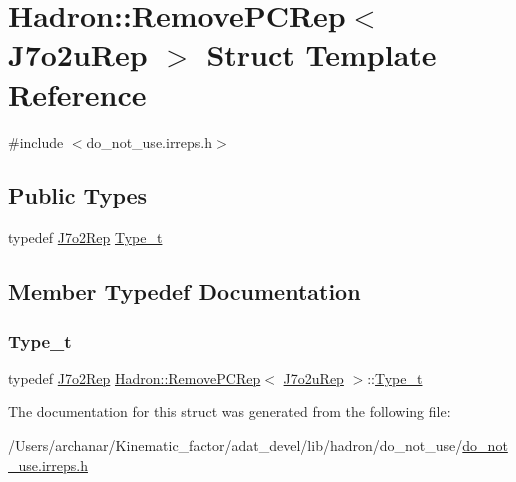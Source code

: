 \hypertarget{structHadron_1_1RemovePCRep_3_01J7o2uRep_01_4}{}\section{Hadron\+:\+:Remove\+P\+C\+Rep$<$ J7o2u\+Rep $>$ Struct Template Reference}
\label{structHadron_1_1RemovePCRep_3_01J7o2uRep_01_4}


{\ttfamily \#include $<$do\+\_\+not\+\_\+use.\+irreps.\+h$>$}

\subsection*{Public Types}
\begin{DoxyCompactItemize}
\item 
typedef \mbox{\hyperlink{structHadron_1_1J7o2Rep}{J7o2\+Rep}} \mbox{\hyperlink{structHadron_1_1RemovePCRep_3_01J7o2uRep_01_4_a41f9fc887bdc034a1a02ac22a5521c00}{Type\+\_\+t}}
\end{DoxyCompactItemize}


\subsection{Member Typedef Documentation}
\mbox{\label{structHadron_1_1RemovePCRep_3_01J7o2uRep_01_4_a41f9fc887bdc034a1a02ac22a5521c00}} 
\subsubsection{\texorpdfstring{Type\_t}{Type\_t}}
{\footnotesize\ttfamily typedef \mbox{\hyperlink{structHadron_1_1J7o2Rep}{J7o2\+Rep}} \mbox{\hyperlink{structHadron_1_1RemovePCRep}{Hadron\+::\+Remove\+P\+C\+Rep}}$<$ \mbox{\hyperlink{structHadron_1_1J7o2uRep}{J7o2u\+Rep}} $>$\+::\mbox{\hyperlink{structHadron_1_1RemovePCRep_3_01J7o2uRep_01_4_a41f9fc887bdc034a1a02ac22a5521c00}{Type\+\_\+t}}}



The documentation for this struct was generated from the following file\+:\begin{DoxyCompactItemize}
\item 
/\+Users/archanar/\+Kinematic\+\_\+factor/adat\+\_\+devel/lib/hadron/do\+\_\+not\+\_\+use/\mbox{\hyperlink{do__not__use_8irreps_8h}{do\+\_\+not\+\_\+use.\+irreps.\+h}}\end{DoxyCompactItemize}
